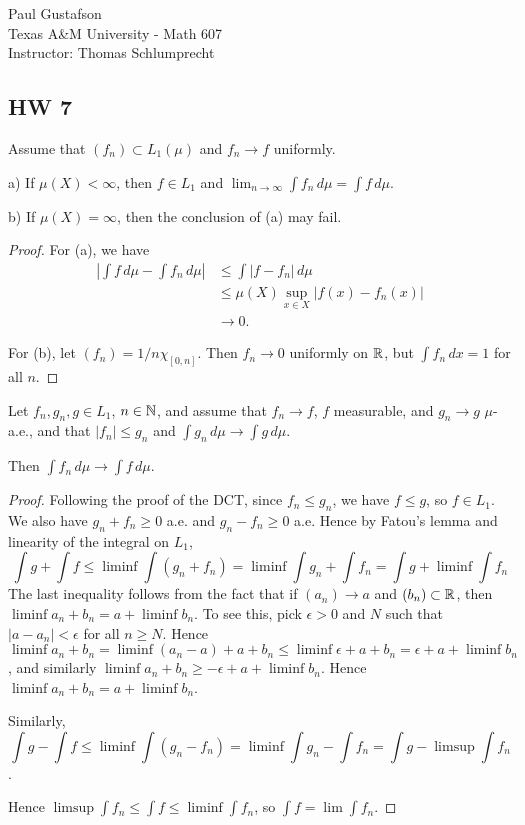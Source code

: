 \documentclass{article}
\begin{document}
\noindent Paul Gustafson\\
\noindent Texas A\&M University - Math 607\\ 
\noindent Instructor: Thomas Schlumprecht

\subsection*{HW 7}
 Assume that $(f_n) \subset L_1(\mu)$ and $f_n \to f$ uniformly.

a) If $\mu(X) < \infty$, then $f \in L_1$ and $\lim_{n\to \infty} \int f_n \, d \mu = \int f \, d\mu$.

b) If $\mu(X) = \infty$, then the conclusion of (a) may fail.

\begin{proof}
For (a), we have
\begin{align*}
\left | \int f \, d \mu - \int f_n \, d \mu \right| & \le \int |f - f_n| \, d \mu
\\ & \le \mu(X) \sup_{x \in X} |f(x) - f_n(x)|
\\ & \to 0.
\end{align*}

For (b), let $(f_n) = 1/n \chi_{[0,n]}$. Then $f_n \to 0$ uniformly on $\mathbb{R}$, but $\int f_n \, dx = 1$ for all $n$.
\end{proof}

 Let $f_n, g_n, g \in L_1$, $n \in \mathbb{N}$, and assume that $f_n \to f$, $f$ measurable, and $g_n \to g$ $\mu$-a.e., and that $|f_n| \le g_n$ and $\int g_n \, d \mu \to \int g \, d\mu$. 

Then $\int f_n \, d \mu \to \int f \, d \mu$.

\begin{proof}
Following the proof of the DCT, since $f_n \le g_n$, we have $f \le g$, so $f \in L_1$. We also have $g_n + f_n \ge 0$ a.e. and $g_n - f_n \ge 0$ a.e.  Hence by Fatou's lemma and linearity of the integral on $L_1$,
$$\int g + \int f \le \liminf \int (g_n + f_n)= \liminf \int g_n +  \int f_n = \int g + \liminf \int f_n$$
The last inequality follows from the fact that if $(a_n) \to a$ and $(b_n) \subset \mathbb{R}$, then $\liminf a_n + b_n = a + \liminf b_n$.  To see this, pick $\epsilon > 0$ and $N$ such that $|a - a_n| < \epsilon$ for all $n \ge N$.  Hence $\liminf a_n + b_n = \liminf (a_n - a) + a + b_n \le \liminf \epsilon + a +  b_n = \epsilon + a + \liminf b_n$, and similarly $\liminf a_n + b_n \ge -\epsilon + a + \liminf b_n$.   Hence $\liminf a_n + b_n = a + \liminf b_n$.

Similarly,
$$\int g - \int f \le \liminf \int (g_n - f_n) = \liminf \int g_n -  \int f_n = \int g - \limsup \int f_n$$.

Hence $\limsup \int f_n \le \int f \le \liminf \int f_n$, so $\int f = \lim \int f_n$.
\end{proof}
\end{document}
